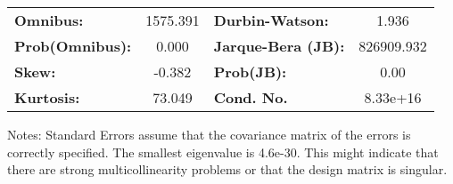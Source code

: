 \begin{center}
\begin{tabular}{lcccccc}
\bottomrule
\end{tabular}
\begin{tabular}{lclc}
\textbf{Omnibus:}       & 1575.391 & \textbf{  Durbin-Watson:     } &     1.936   \\
\textbf{Prob(Omnibus):} &   0.000  & \textbf{  Jarque-Bera (JB):  } & 826909.932  \\
\textbf{Skew:}          &  -0.382  & \textbf{  Prob(JB):          } &      0.00   \\
\textbf{Kurtosis:}      &  73.049  & \textbf{  Cond. No.          } &  8.33e+16   \\
\bottomrule
\end{tabular}
\end{center}

Notes: \newline
 [1] Standard Errors assume that the covariance matrix of the errors is correctly specified. \newline
 [2] The smallest eigenvalue is 4.6e-30. This might indicate that there are \newline
 strong multicollinearity problems or that the design matrix is singular.